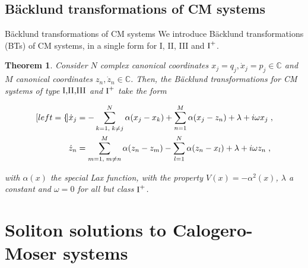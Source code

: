 \documentclass[aspectratio=169, 9pt]{beamer}
\newtheorem{thm}{Theorem}
\begin{document}
\subsection{Bäcklund transformations of CM systems}
\begin{frame}[allowframebreaks]{Bäcklund transformations of CM systems}
We introduce Bäcklund transformations (BTs) of CM systems, in a single form for I, II, III and $\textnormal{I}^+$.

\begin{thm}
Consider $N$ complex canonical coordinates $x_j = q_j, \dot x_j = p_j \in \mathbb{C}$ and $M$ canonical coordinates $z_n, \dot z_n \in \mathbb{C}$. Then, the Bäcklund transformations for CM systems of type $\textnormal{I,II,III}$ and $\textnormal{I}^+$ take the form

\begin{subequations}
\begin{align}[left=\empheqlbrace]
\dot x_j &= - \sum_{k=1,\;k \neq j}^N \alpha(x_j - x_k) + \sum_{n = 1}^M \alpha(x_j - z_n) + \lambda + i\omega x_j\;,\\
\dot z_n &= \sum_{m=1,\;m \neq n}^M \alpha(z_n - z_m) - \sum_{l = 1}^N \alpha(z_n - x_l) + \lambda + i\omega z_n\;,
\end{align}
\end{subequations}

with $\alpha(x)$ the \textit{special Lax function}, with the property $V(x) = - \alpha^2(x)$, $\lambda$ a constant and $\omega = 0$ for all but class $\textnormal{I}^+$.
\end{thm}
\end{frame}

\section{Soliton solutions to Calogero-Moser systems}
\end{document}
